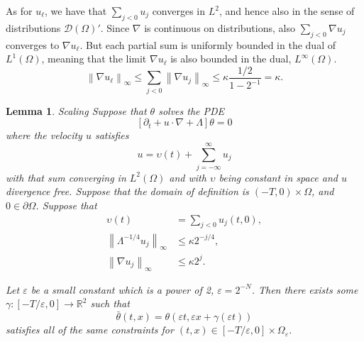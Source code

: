 \documentclass[11pt]{amsart}
\newtheorem{lemma}[theorem]{Lemma}
\theoremstyle{remark}
\newcommand{\R}{\mathbb{R}}
\newcommand{\eps}{\varepsilon}
\newcommand{\norm}[1]{\left\lVert#1\right\rVert}
\newcommand{\bracket}[1]{\left[ #1 \right]}
\newcommand{\del}{\partial}
\newcommand{\grad}{\nabla}
\newcommand{\test}{\mathcal{D}}
\begin{document}
As for $u_\ell$, we have that $\sum_{j < 0} u_j$ converges in $L^2$, and hence also in the sense of distributions $\test(\Omega)'$.  Since $\grad$ is continuous on distributions, also $\sum_{j<0} \grad u_j$ converges to $\grad u_\ell$.  But each partial sum is uniformly bounded in the dual of $L^1(\Omega)$, meaning that the limit $\grad u_\ell$ is also bounded in the dual, $L^\infty(\Omega)$.  
\[ \norm{\grad u_\ell}_\infty \leq \sum_{j < 0} \norm{\grad u_j}_\infty \leq \kappa \frac{1/2}{1 - 2^{-1}} = \kappa. \]

\begin{lemma}{Scaling}
Suppose that $\theta$ solves the PDE
\[ \bracket{\del_t + u\cdot\grad + \Lambda} \theta = 0\]
where the velocity $u$ satisfies
\[ u = \upsilon(t) + \sum_{j=-\infty}^\infty u_j \]
with that sum converging in $L^2(\Omega)$ and with $\upsilon$ being constant in space and $u$ divergence free.  Suppose that the domain of definition is $(-T,0) \times \Omega$, and $0 \in \del \Omega$.  Suppose that
\begin{align*}
\upsilon(t) &= \sum_{j<0} u_j(t,0), \\
\norm{\Lambda^{-1/4} u_j}_\infty &\leq \kappa 2^{-j/4}, \\
\norm{\grad u_j}_\infty &\leq \kappa 2^j.
\end{align*}

Let $\eps$ be a small constant which is a power of 2, $\eps = 2^{-N}$. Then there exists some $\gamma: [-T/\eps ,0] \to \R^2$ such that
\[ \bar{\theta}(t,x) = \theta(\eps t, \eps x + \gamma(\eps t)) \]
satisfies all of the same constraints for $(t,x) \in [-T/\eps, 0]\times \Omega_\eps$.  
\end{lemma}
\end{document}
